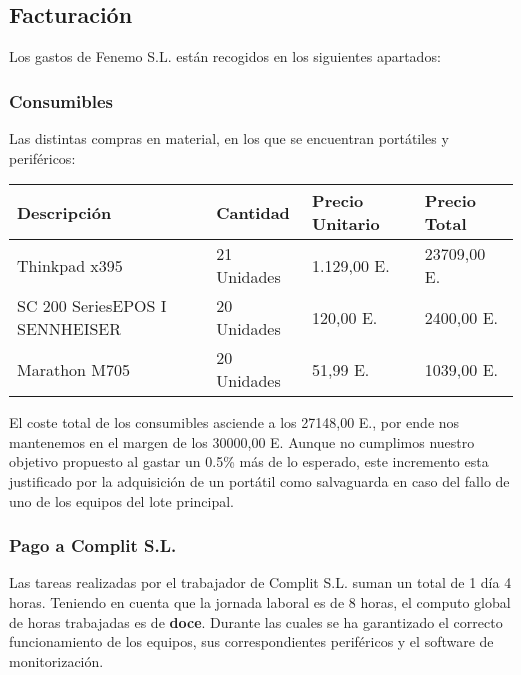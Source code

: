 \documentclass[11pt]{article}
\begin{document}
\subsection{Facturación}
\label{sec:org15c61d6}

Los gastos de Fenemo S.L. están recogidos en los siguientes apartados:

\subsubsection{Consumibles}
\label{sec:orgbd2e2a4}
Las distintas compras en material, en los que se encuentran portátiles y periféricos:
\begin{adjustbox}{width={\textwidth},keepaspectratio}
\centering
\begin{center}
\begin{tabular}{llll}
Descripción & Cantidad & Precio Unitario & Precio Total\\
\hline
Thinkpad x395 & 21 Unidades & 1.129,00 E. & 23709,00 E.\\
SC 200 SeriesEPOS I SENNHEISER & 20 Unidades & 120,00 E. & 2400,00 E.\\
Marathon M705 & 20 Unidades & 51,99 E. & 1039,00 E.\\
\end{tabular}
\end{center}
\end{adjustbox}

El coste total de los consumibles asciende a los 27148,00 E., por ende nos mantenemos en el margen de los 30000,00 E. Aunque no cumplimos nuestro objetivo propuesto al gastar un 0.5\% más de lo esperado, este incremento esta justificado por la adquisición de un portátil como salvaguarda en caso del fallo de uno de los equipos del lote principal.

\subsubsection{Pago a Complit S.L.}
\label{sec:orgb23850f}
Las tareas realizadas por el trabajador de Complit S.L. suman un total de 1 día 4 horas. Teniendo en cuenta que la jornada laboral es de 8 horas, el computo global de horas trabajadas es de \textbf{doce}. Durante las cuales se ha garantizado el correcto funcionamiento de los equipos, sus correspondientes periféricos y el software de monitorización.
\end{document}
